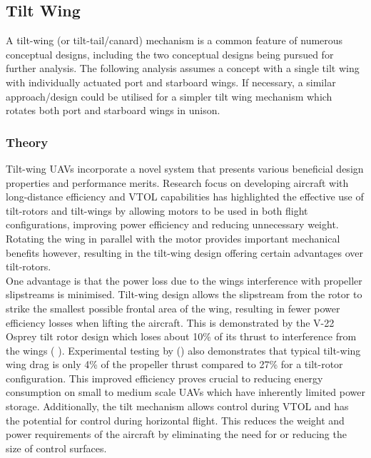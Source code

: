 \subsection{Tilt Wing}
\label{tiltwing}
A tilt-wing (or tilt-tail/canard) mechanism is a common feature of numerous conceptual designs, including the two conceptual designs being pursued for further analysis. The following analysis assumes a concept with a single tilt wing with individually actuated port and starboard wings. If necessary, a similar approach/design could be utilised for a simpler tilt wing mechanism which rotates both port and starboard wings in unison. 

\subsubsection{Theory}
Tilt-wing UAVs incorporate a novel system that presents various beneficial design properties and performance merits. Research focus on developing aircraft with long-distance efficiency and VTOL capabilities has highlighted the effective use of tilt-rotors and tilt-wings by allowing motors to be used in both flight configurations, improving power efficiency and reducing unnecessary weight. Rotating the wing in parallel with the motor provides important mechanical benefits however, resulting in the tilt-wing design offering certain advantages over tilt-rotors. \\

One advantage is that the power loss due to the wings interference with propeller slipstreams is minimised. Tilt-wing design allows the slipstream from the rotor to strike the smallest possible frontal area of the wing, resulting in fewer power efficiency losses when lifting the aircraft. This is demonstrated by the V-22 Osprey tilt rotor design which loses about 10\% of its thrust to interference from the wings (\citeauthor{paduano2017system} \citeyear{paduano2017system}). Experimental testing by \citeauthor{inproceedings} (\citeyear{inproceedings}) also demonstrates that typical tilt-wing wing drag is only 4\% of the propeller thrust compared to 27\% for a tilt-rotor configuration. This improved efficiency proves crucial to reducing energy consumption on small to medium scale UAVs which have inherently limited power storage. Additionally, the tilt mechanism allows control during VTOL and has the potential for control during horizontal flight. This reduces the weight and power requirements of the aircraft by eliminating the need for or reducing the size of control surfaces.\\

